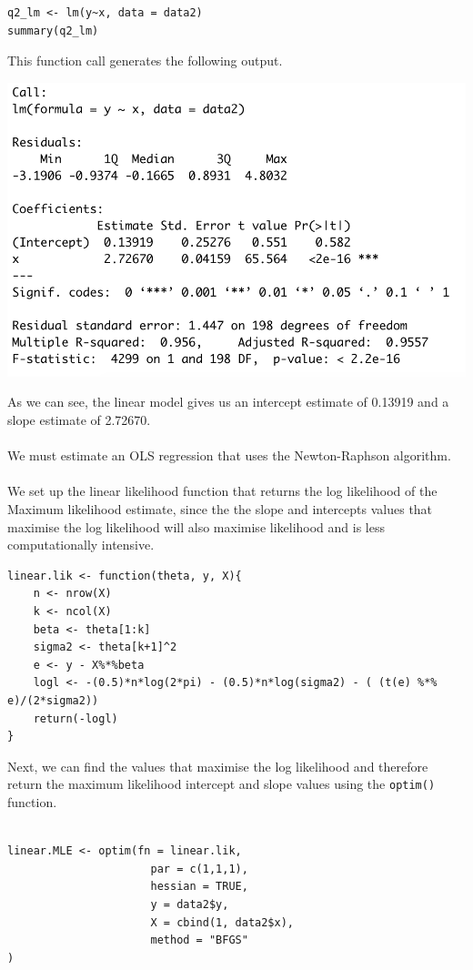 \documentclass[12pt,letterpaper]{article}
\begin{document}
\begin{lstlisting}
q2_lm <- lm(y~x, data = data2)
summary(q2_lm)
\end{lstlisting}

\noindent This function call generates the following output.

\includegraphics{summary(q2_lm).png}

\noindent As we can see, the linear model gives us an intercept estimate of 0.13919 and a slope estimate of 2.72670.
\\\\

\noindent We must estimate an OLS regression that uses the Newton-Raphson algorithm.
\\\\
\noindent We set up the linear likelihood function that returns the log likelihood of the Maximum likelihood estimate, since the the slope and intercepts values that maximise the log likelihood will also maximise likelihood and is less computationally intensive.

\begin{lstlisting}
linear.lik <- function(theta, y, X){
	n <- nrow(X)
	k <- ncol(X)
	beta <- theta[1:k]
	sigma2 <- theta[k+1]^2
	e <- y - X%*%beta
	logl <- -(0.5)*n*log(2*pi) - (0.5)*n*log(sigma2) - ( (t(e) %*% e)/(2*sigma2))
	return(-logl)
}
\end{lstlisting}

\noindent Next, we can find the values that maximise the log likelihood and therefore return the maximum likelihood intercept and slope values using the \texttt{optim()} function.
\\\\
\begin{lstlisting}
linear.MLE <- optim(fn = linear.lik,
					  par = c(1,1,1),
					  hessian = TRUE,
					  y = data2$y,
					  X = cbind(1, data2$x),
					  method = "BFGS"
)
\end{lstlisting}
\end{document}

